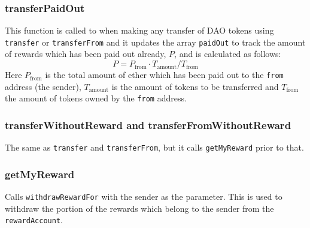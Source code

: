\documentclass[9pt,oneside]{amsart}
\begin{document}
\begin{multicols}{2}
\subsubsection*{transferPaidOut}
This function is called to when making any transfer of DAO tokens using \verb|transfer| or \verb|transferFrom| and it updates the array \verb|paidOut| to track the amount of rewards which has been paid out already, $P$, and is calculated as follows:
\begin{equation}
 P = P_{\text{from}} \cdot T_{\text{amount}} / T_{\text{from}}
\end{equation}
Here $P_{\text{from}}$ is the total amount of ether which has been paid out to the \verb|from| address (the sender), $T_{\text{amount}}$ is the amount of tokens to be transferred and $T_{\text{from}}$ the amount of tokens owned by the \verb|from| address.

\subsubsection*{transferWithoutReward and transferFromWithoutReward}
The same as \verb|transfer| and \verb|transferFrom|, but it calls \verb|getMyReward| prior to that.

\subsubsection*{getMyReward}
Calls \verb|withdrawRewardFor| with the sender as the parameter. This is used to withdraw the portion of the rewards which belong to the sender from the \verb|rewardAccount|.


\end{multicols}
\end{document}
